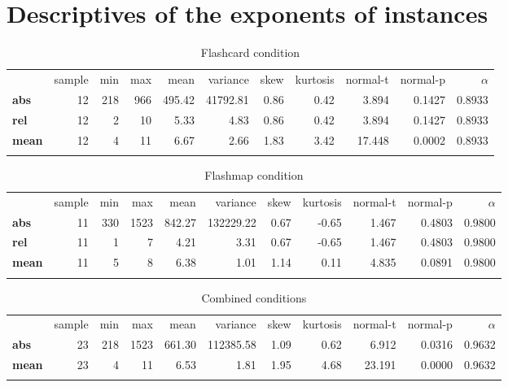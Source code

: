 \FloatBarrier
\section{Descriptives of the exponents of instances}

\begin{longtable}[c]{@{}lrrrrrrrrrr@{}}
    \caption{Flashcard condition}
    \endfirsthead
\toprule\addlinespace
& sample & min & max & mean & variance & skew & kurtosis & normal-t &
normal-p & $\alpha$
\\\addlinespace
\midrule
\textbf{abs} & 12 & 218 & 966 & 495.42 & 41792.81 & 0.86 & 0.42 & 3.894
& 0.1427 & 0.8933
\\\addlinespace
\textbf{rel} & 12 & 2 & 10 & 5.33 & 4.83 & 0.86 & 0.42 & 3.894 & 0.1427
& 0.8933
\\\addlinespace
\textbf{mean} & 12 & 4 & 11 & 6.67 & 2.66 & 1.83 & 3.42 & 17.448 &
0.0002 & 0.8933
\\\addlinespace
\bottomrule
    \label{tab:exponent_fc}
\end{longtable}

\begin{longtable}[c]{@{}lrrrrrrrrrr@{}}
    \caption{Flashmap condition}
    \endfirsthead
\toprule\addlinespace
& sample & min & max & mean & variance & skew & kurtosis & normal-t &
normal-p & $\alpha$
\\\addlinespace
\midrule
\textbf{abs} & 11 & 330 & 1523 & 842.27 & 132229.22 & 0.67 & -0.65 &
1.467 & 0.4803 & 0.9800
\\\addlinespace
\textbf{rel} & 11 & 1 & 7 & 4.21 & 3.31 & 0.67 & -0.65 & 1.467 & 0.4803
& 0.9800
\\\addlinespace
\textbf{mean} & 11 & 5 & 8 & 6.38 & 1.01 & 1.14 & 0.11 & 4.835 & 0.0891
& 0.9800
\\\addlinespace
\bottomrule
    \label{tab:exponent_fm}
\end{longtable}

\begin{longtable}[c]{@{}lrrrrrrrrrr@{}}
    \caption{Combined conditions}
    \endfirsthead
\toprule\addlinespace
& sample & min & max & mean & variance & skew & kurtosis & normal-t &
normal-p & $\alpha$
\\\addlinespace
\midrule
\textbf{abs} & 23 & 218 & 1523 & 661.30 & 112385.58 & 1.09 & 0.62 &
6.912 & 0.0316 & 0.9632
\\\addlinespace
\textbf{mean} & 23 & 4 & 11 & 6.53 & 1.81 & 1.95 & 4.68 & 23.191 &
0.0000 & 0.9632
\\\addlinespace
\bottomrule
    \label{tab:exponent_gen}
\end{longtable}

